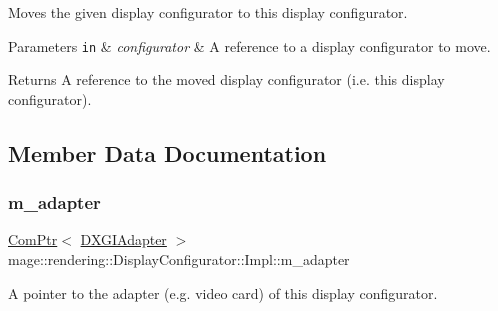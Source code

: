 Moves the given display configurator to this display configurator.


\begin{DoxyParams}[1]{Parameters}
\mbox{\tt in}  & {\em configurator} & A reference to a display configurator to move. \\
\hline
\end{DoxyParams}
\begin{DoxyReturn}{Returns}
A reference to the moved display configurator (i.\+e. this display configurator). 
\end{DoxyReturn}


\subsection{Member Data Documentation}
\mbox{\label{classmage_1_1rendering_1_1_display_configurator_1_1_impl_a49b407f044b7e34f9b58dbd86648bb46}} 
\subsubsection{\texorpdfstring{m\+\_\+adapter}{m\_adapter}}
{\footnotesize\ttfamily \mbox{\hyperlink{namespacemage_ae74f374780900893caa5555d1031fd79}{Com\+Ptr}}$<$ \mbox{\hyperlink{namespacemage_1_1rendering_ad55e028ebd705b547eeb972ad8d03b6a}{D\+X\+G\+I\+Adapter}} $>$ mage\+::rendering\+::\+Display\+Configurator\+::\+Impl\+::m\+\_\+adapter\hspace{0.3cm}{\ttfamily [private]}}

A pointer to the adapter (e.\+g. video card) of this display configurator. \mbox{\label{classmage_1_1rendering_1_1_display_configurator_1_1_impl_a445c59ccde512df51bb77b9aaa2ecb23}} 
